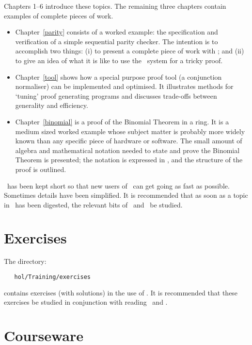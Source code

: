 Chapters 1--6 introduce these topics. The remaining three chapters
contain examples of complete pieces of work.
\begin{itemize}
\item Chapter~\ref{parity}
consists of a worked example: the specification and
verification of a simple sequential parity checker.  The intention is
to   accomplish two things:
(i) to present a complete piece of work with \HOL; and
(ii) to give an idea of what it is like to use the \HOL\
system for a tricky proof.

\item Chapter~\ref{tool} shows how a special purpose proof tool (a conjunction
normaliser) can be implemented and optimised. It illustrates methods for
`tuning' proof generating programs and discusses trade-offs between generality
and efficiency.

\item Chapter~\ref{binomial} is a proof of the Binomial Theorem in a ring.  It
is a medium sized worked example whose subject matter is probably more widely
known than any specific piece of hardware or software. The small amount of
algebra and mathematical notation needed to state and prove the Binomial
Theorem is presented; the notation is expressed in \HOL{}, and the
structure of the proof is outlined.

\end{itemize}

\noindent \TUTORIAL\ has been kept short so that new users of \HOL\ can get
going as fast as possible. Sometimes details have been simplified. It is
recommended that as soon as a topic in \TUTORIAL\ has been digested, the
relevant bits of \DESCRIPTION\ and \REFERENCE\ be studied.

\section*{Exercises}

The directory:

\begin{hol}\begin{verbatim}
   hol/Training/exercises
\end{verbatim}\end{hol}

\noindent contains exercises (with solutions) in the use of \HOL. It is
recommended that these exercises be studied in conjunction with reading
\TUTORIAL\ and \DESCRIPTION.

\section*{Courseware}

